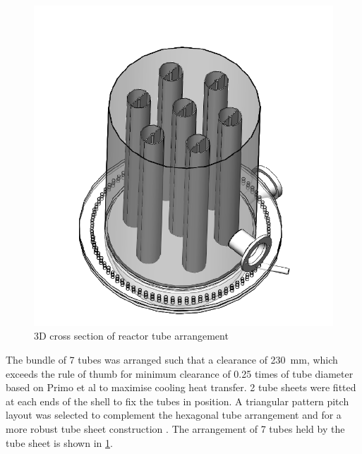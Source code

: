\begin{figure}
    \centering
    \includegraphics[width=\linewidth]{chapters/2-reaction/figures/FYD reactor 7 tubes cross section 3D.PNG}
    \caption{3D cross section of reactor tube arrangement}
    \label{fig:reactortubearrangement}
\end{figure}
The bundle of 7 tubes was arranged such that a clearance of \SI{230}{\milli \metre}, which exceeds the rule of thumb for minimum clearance of 0.25 times of tube diameter based on Primo et al \cite{primo_shell_2012} to maximise cooling heat transfer. 2 tube sheets were fitted at each ends of the shell to fix the tubes in position. A triangular pattern pitch layout was selected to complement the hexagonal tube arrangement and for a more robust tube sheet construction \cite{primo_shell_2012}.  The arrangement of 7 tubes held by the tube sheet is shown in \cref{fig:reactortubearrangement}.


